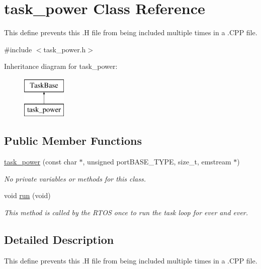 \hypertarget{classtask__power}{\section{task\-\_\-power Class Reference}
\label{classtask__power}
}


This define prevents this .H file from being included multiple times in a .C\-P\-P file.  




{\ttfamily \#include $<$task\-\_\-power.\-h$>$}

Inheritance diagram for task\-\_\-power\-:\begin{figure}[H]
\begin{center}
\leavevmode
\includegraphics[height=2.000000cm]{classtask__power}
\end{center}
\end{figure}
\subsection*{Public Member Functions}
\begin{DoxyCompactItemize}
\item 
\hyperlink{classtask__power_ae242e014ed8c437adf6854435639b4b2}{task\-\_\-power} (const char $\ast$, unsigned port\-B\-A\-S\-E\-\_\-\-T\-Y\-P\-E, size\-\_\-t, emstream $\ast$)
\begin{DoxyCompactList}\small\item\em No private variables or methods for this class. \end{DoxyCompactList}\item 
void \hyperlink{classtask__power_acd7acd956c7b0d62f6bd7dabd0b1a6f5}{run} (void)
\begin{DoxyCompactList}\small\item\em This method is called by the R\-T\-O\-S once to run the task loop for ever and ever. \end{DoxyCompactList}\end{DoxyCompactItemize}


\subsection{Detailed Description}
This define prevents this .H file from being included multiple times in a .C\-P\-P file. 

